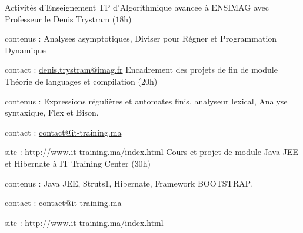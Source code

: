 
\begin{rubric}{Activités d’Enseignement}
\entry*[$2015$ -- $2016$]%
	TP d'Algorithmique avancee à ENSIMAG avec Professeur le Denis Trystram ($18$h)
	\par contenus : Analyses asymptotiques, Diviser pour Régner et Programmation Dynamique
	\par contact :  \href{mailto:denis.trystram@imag.fr}{denis.trystram@imag.fr}
%
\entry*[$2014$ -- $2015$]
        Encadrement des projets de fin de module Théorie de languages et compilation ($20$h)
	\par contenus : Expressions régulières et automates finis, analyseur lexical, Analyse syntaxique, Flex et Bison.
	\par contact :  \href{mailto:contact@it-training.ma}{contact@it-training.ma}
	\par site : \url{http://www.it-training.ma/index.html}
%
\entry*[$2014$ -- $2015$]%
        Cours et projet de module Java JEE et Hibernate à IT Training Center ($30$h)
	\par contenus : Java JEE, Struts1, Hibernate, Framework BOOTSTRAP.
	\par contact :  \href{mailto:contact@it-training.ma}{contact@it-training.ma}
	\par site : \url{http://www.it-training.ma/index.html}
%
\end{rubric}
